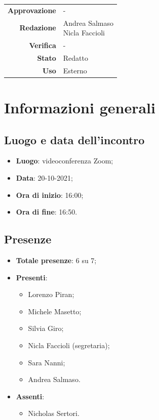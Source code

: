 \documentclass[11pt]{article}
\begin{document}
\begin{titlepage}
\begin{center}
			\large
			
			
			\vfill
			
			\begin{tabular}{r|l}
				\textbf{Approvazione} &  -\\
				\textbf{Redazione} &  \parbox[t]{3.5cm}{Andrea Salmaso \\Nicla Faccioli}\\
				\textbf{Verifica} &  -\\
				\textbf{Stato} & Redatto \\
				\textbf{Uso} & Esterno
			\end{tabular}
			\vfill
			
		\end{center}
	\end{titlepage}

	\newpage

	\section{Informazioni generali}
	\subsection{Luogo e data dell'incontro}
	\begin{itemize}
		\item \textbf{Luogo}: videoconferenza Zoom;
		\item \textbf{Data}: 20-10-2021;
		\item \textbf{Ora di inizio}: 16:00;
		\item \textbf{Ora di fine}: 16:50.
	\end{itemize}
	
	\subsection{Presenze}
	\begin{itemize}
		\item \textbf{Totale presenze}: 6 su 7;
		\item \textbf{Presenti}:
		\begin{itemize}
			\item Lorenzo Piran; 
			\item Michele Masetto;
			\item Silvia Giro;
			\item Nicla Faccioli (segretaria);
			\item Sara Nanni;
			\item Andrea Salmaso.
			
		\end{itemize}
		\item \textbf{Assenti}:
			\begin{itemize}
				\item Nicholas Sertori.
			\end{itemize}
	\end{itemize}
	
\end{document}
